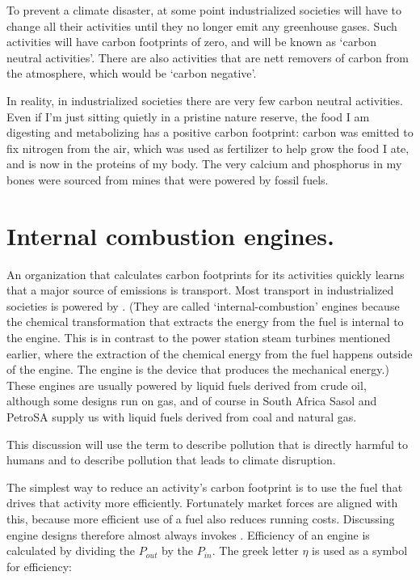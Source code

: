 To prevent a climate disaster, at some point industrialized societies will have
to change all their activities until they no longer emit any greenhouse gases.
Such activities will have carbon footprints of zero, and will be known as
`carbon neutral activities'. There are also activities that are nett removers of
carbon from the atmosphere, which would be `carbon negative'.

In reality, in industrialized societies there are very few carbon neutral
activities. Even if I'm just sitting quietly in a pristine nature reserve, the
food I am digesting and metabolizing has a positive carbon footprint: carbon
was emitted to fix nitrogen from the air, which was used as fertilizer to help
grow the food I ate, and is now in the proteins of my body. The very calcium and
phosphorus in my bones were sourced from mines that were powered by fossil
fuels. 

\section{Internal combustion engines.}

An organization that calculates carbon footprints for its activities quickly
learns that a major source of emissions is transport. Most transport in
industrialized societies is powered by . (They are called `internal\hyp{}combustion' engines because the
chemical transformation that extracts the energy from the fuel is internal to
the engine. This is in contrast to the power station steam turbines mentioned
earlier, where the extraction of the chemical energy from the fuel happens
outside of the engine. The engine is the device that produces the mechanical
energy.) These engines are usually powered by liquid fuels derived from crude
oil, although some designs run on gas, and of course in South Africa Sasol and
PetroSA supply us with liquid fuels derived from coal and natural gas.

This discussion will use the term  to describe
pollution that is directly harmful to humans and  to
describe pollution that leads to climate disruption.

The simplest way to reduce an activity's carbon footprint is to use the fuel
that drives that activity more efficiently. Fortunately market forces are
aligned with this, because more efficient use of a fuel also reduces running
costs. Discussing engine designs therefore almost always invokes
. Efficiency of an engine is calculated by dividing the
 \(P_{out}\) by the  \(P_{in}\). The
greek letter \(\eta\) is used as a symbol for efficiency:

